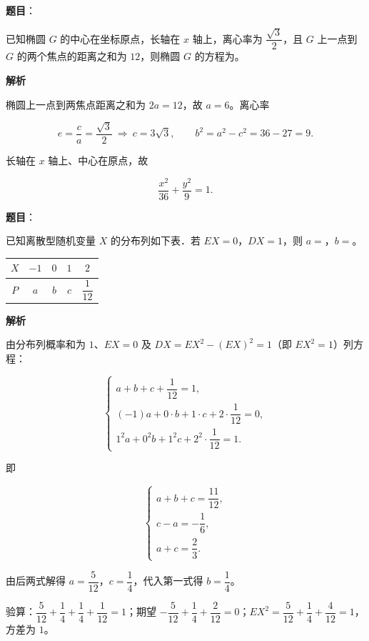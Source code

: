 \begin{answer}

\textbf{题目}：

已知椭圆 $G$ 的中心在坐标原点，长轴在 $x$ 轴上，离心率为 $\dfrac{\sqrt3}{2}$，且 $G$ 上一点到 $G$ 的两个焦点的距离之和为 $12$，则椭圆 $G$ 的方程为\gkblank{}。

\textbf{解析}

椭圆上一点到两焦点距离之和为 $2a=12$，故 $a=6$。离心率

\nopagebreak[4]
\[e=\frac ca=\frac{\sqrt3}{2}\ \Longrightarrow\ c=3\sqrt3,\qquad b^2=a^2-c^2=36-27=9.\]

长轴在 $x$ 轴上、中心在原点，故

\nopagebreak[4]
\[\frac{x^2}{36}+\frac{y^2}{9}=1.\]


\end{answer}
\begin{answer}

\textbf{题目}：

已知离散型随机变量 $X$ 的分布列如下表．若 $EX=0$，$DX=1$，则 $a=$\gkblank{}，$b=$\gkblank{}。

\begin{center}
\begin{tabular}{ccccc}
\toprule
$X$ & $-1$ & $0$ & $1$ & $2$ \\
\midrule
$P$ & $a$ & $b$ & $c$ & $\dfrac{1}{12}$ \\
\bottomrule
\end{tabular}
\end{center}

\textbf{解析}

由分布列概率和为 $1$、$EX=0$ 及 $DX=EX^2-(EX)^2=1$（即 $EX^2=1$）列方程：

\nopagebreak[4]
\[\begin{cases}a+b+c+\dfrac1{12}=1,\\[4pt] (-1)a+0\cdot b+1\cdot c+2\cdot\dfrac1{12}=0,\\[4pt] 1^2a+0^2b+1^2c+2^2\cdot\dfrac1{12}=1.\end{cases}\]

即

\nopagebreak[4]
\[\begin{cases}a+b+c=\dfrac{11}{12},\\[4pt] c-a=-\dfrac16,\\[4pt] a+c=\dfrac23.\end{cases}\]

由后两式解得 $a=\dfrac5{12}$，$c=\dfrac14$，代入第一式得 $b=\dfrac14$。

验算：$\dfrac5{12}+\dfrac14+\dfrac14+\dfrac1{12}=1$；期望 $-\dfrac5{12}+\dfrac14+\dfrac2{12}=0$；$EX^2=\dfrac5{12}+\dfrac14+\dfrac4{12}=1$，方差为 $1$。


\end{answer}
